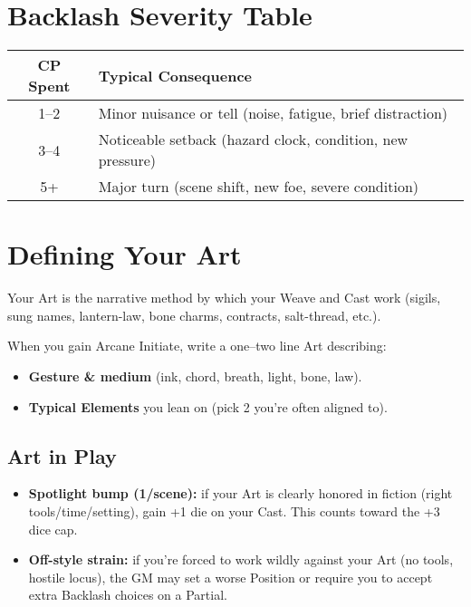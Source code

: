 \section{Backlash Severity Table}

\begin{center}
\begin{tabular}{cl}
\toprule
\textbf{CP Spent} & \textbf{Typical Consequence} \\
\midrule
1–2 & Minor nuisance or tell (noise, fatigue, brief distraction) \\
3–4 & Noticeable setback (hazard clock, condition, new pressure) \\
5+ & Major turn (scene shift, new foe, severe condition) \\
\bottomrule
\end{tabular}
\end{center}

\section{Defining Your Art}

Your Art is the narrative method by which your Weave and Cast work (sigils, sung names, lantern-law, bone charms, contracts, salt-thread, etc.).

When you gain Arcane Initiate, write a one–two line Art describing:
\begin{itemize}
    \item \textbf{Gesture \& medium} (ink, chord, breath, light, bone, law).
    \item \textbf{Typical Elements} you lean on (pick 2 you're often aligned to).
\end{itemize}

\subsection*{Art in Play}
\begin{itemize}
    \item \textbf{Spotlight bump (1/scene):} if your Art is clearly honored in fiction (right tools/time/setting), gain +1 die on your Cast. This counts toward the +3 dice cap.
    \item \textbf{Off-style strain:} if you're forced to work wildly against your Art (no tools, hostile locus), the GM may set a worse Position or require you to accept extra Backlash choices on a Partial.
\end{itemize}

